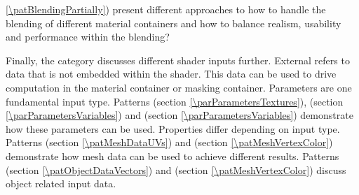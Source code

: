 \ref{\patBlendingPartially}) present different approaches to  how to handle the blending of different material containers and how to balance realism, usability and performance within the blending?


Finally, the category \emph{\patCatExternalInputs} discusses different shader inputs further. External refers to data that is not embedded within the shader. This data can be used to drive computation in the material container or masking container. Parameters are one fundamental input type. Patterns \emph{\parParametersTextures} (section \ref{\parParametersTextures}), \emph{\parParametersVariables} (section \ref{\parParametersVariables}) and \emph{\parParametersScripted} (section \ref{\parParametersVariables}) demonstrate how these parameters can be used. Properties differ depending on input type. Patterns  \emph{\patMeshDataUVs} (section \ref{\patMeshDataUVs}) and \emph{\patMeshVertexColor} (section \ref{\patMeshVertexColor}) demonstrate how mesh data can be used to achieve different results. Patterns  \emph{\patObjectDataVectors} (section \ref{\patObjectDataVectors}) and \emph{\patMeshVertexColor} (section \ref{\patMeshVertexColor}) discuss object related input data. 

